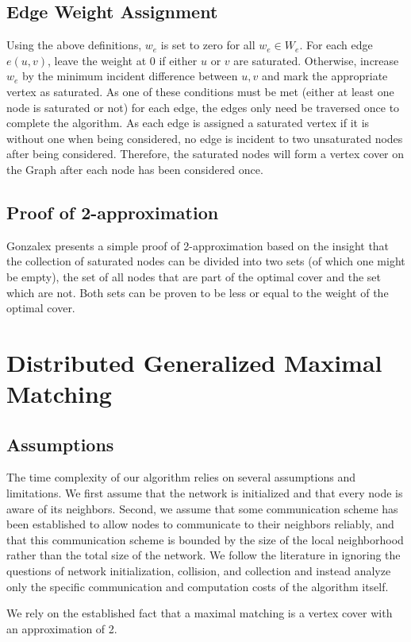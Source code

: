 \subsection{Edge Weight Assignment}
\label{sec:sequential}
Using the above definitions, $w_e$ is set to zero for all $w_e\in W_e$. For each edge $e(u,v)$, leave the weight at 0 if either $u$ or $v$ are saturated. Otherwise, increase $w_e$ by the minimum incident difference between $u,v$ and mark the appropriate vertex as saturated. As one of these conditions must be met (either at least one node is saturated or not) for each edge, the edges only need be traversed once to complete the algorithm. As each edge is assigned a saturated vertex if it is without one when being considered, no edge is incident to two unsaturated nodes after being considered. Therefore, the saturated nodes will form a vertex cover on the Graph after each node has been considered once.

\subsection{Proof of 2-approximation}
Gonzalex presents a simple proof of 2-approximation based on the insight that the collection of saturated nodes can be divided into two sets (of which one might be empty), the set of all nodes that are part of the optimal cover and the set which are not. Both sets can be proven to be less or equal to the weight of the optimal cover.
\section{Distributed Generalized Maximal Matching}
\subsection{Assumptions}
The time complexity of our algorithm relies on several assumptions and limitations. We first assume that the network is initialized and that every node is aware of its neighbors. Second, we assume that some communication scheme has been established to allow nodes to communicate to their neighbors reliably, and that this communication scheme is bounded by the size of the local neighborhood rather than the total size of the network. We follow the literature in ignoring the questions of network initialization, collision, and collection and instead analyze only the specific communication and computation costs of the algorithm itself.

We rely on the established fact that a maximal matching is a vertex cover with an approximation of 2.\cite{1435381}  
